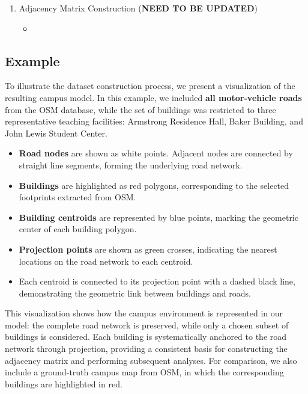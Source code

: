 \documentclass[fleqn,10pt]{olplainarticle}
\begin{document}
\begin{enumerate}
    \item Adjacency Matrix Construction (\textbf{NEED TO BE UPDATED})
    \begin{itemize}
        \item 
    \end{itemize}
\end{enumerate}

\subsection*{Example}
To illustrate the dataset construction process, we present a visualization of the resulting campus model. In this example, we included \textbf{all motor-vehicle roads} from the OSM database, while the set of buildings was restricted to three representative teaching facilities: Armstrong Residence Hall, Baker Building, and John Lewis Student Center.
\begin{itemize}
    \item \textbf{Road nodes} are shown as white points. Adjacent nodes are connected by straight line segments, forming the underlying road network.
    \item \textbf{Buildings} are highlighted as red polygons, corresponding to the selected footprints extracted from OSM.
    \item \textbf{Building centroids} are represented by blue points, marking the geometric center of each building polygon.
    \item \textbf{Projection points} are shown as green crosses, indicating the nearest locations on the road network to each centroid.
    \item Each centroid is connected to its projection point with a dashed black line, demonstrating the geometric link between buildings and roads.
\end{itemize}

This visualization shows how the campus environment is represented in our model: the complete road network is preserved, while only a chosen subset of buildings is considered. Each building is systematically anchored to the road network through projection, providing a consistent basis for constructing the adjacency matrix and performing subsequent analyses. For comparison, we also include a ground-truth campus map from OSM, in which the corresponding buildings are highlighted in red.
\end{document}
